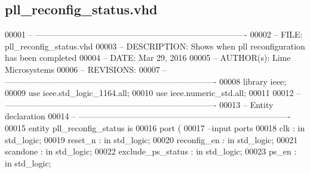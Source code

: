 \subsection{pll\+\_\+reconfig\+\_\+status.\+vhd}
\label{pll__reconfig__status_8vhd_source}

\begin{DoxyCode}
00001 \textcolor{keyword}{-- ---------------------------------------------------------------------------- }
00002 \textcolor{keyword}{-- FILE:    pll\_reconfig\_status.vhd}
00003 \textcolor{keyword}{-- DESCRIPTION: Shows when pll reconfiguration has been completed}
00004 \textcolor{keyword}{-- DATE:    Mar 29, 2016}
00005 \textcolor{keyword}{-- AUTHOR(s):   Lime Microsystems}
00006 \textcolor{keyword}{-- REVISIONS:}
00007 \textcolor{keyword}{-- ---------------------------------------------------------------------------- }
00008 \textcolor{vhdlkeyword}{library }\textcolor{keywordflow}{ieee};
00009 \textcolor{vhdlkeyword}{use }ieee.std\_logic\_1164.\textcolor{keywordflow}{all};
00010 \textcolor{vhdlkeyword}{use }ieee.numeric\_std.\textcolor{keywordflow}{all};
00011 
00012 \textcolor{keyword}{-- ----------------------------------------------------------------------------}
00013 \textcolor{keyword}{-- Entity declaration}
00014 \textcolor{keyword}{-- ----------------------------------------------------------------------------}
00015 \textcolor{keywordflow}{entity }pll_reconfig_status \textcolor{keywordflow}{is}
00016   \textcolor{keywordflow}{port} \textcolor{vhdlchar}{(}
00017 \textcolor{keyword}{        --input ports }
00018         \textcolor{vhdlchar}{clk}                 \textcolor{vhdlchar}{:} \textcolor{keywordflow}{in} \textcolor{comment}{std\_logic};
00019         \textcolor{vhdlchar}{reset_n}             \textcolor{vhdlchar}{:} \textcolor{keywordflow}{in} \textcolor{comment}{std\_logic};
00020           \textcolor{vhdlchar}{reconfig_en}           \textcolor{vhdlchar}{:} \textcolor{keywordflow}{in} \textcolor{comment}{std\_logic};
00021           \textcolor{vhdlchar}{scandone}              \textcolor{vhdlchar}{:} \textcolor{keywordflow}{in} \textcolor{comment}{std\_logic};
00022           \textcolor{vhdlchar}{exclude_ps_status} \textcolor{vhdlchar}{:} \textcolor{keywordflow}{in} \textcolor{comment}{std\_logic};
00023           \textcolor{vhdlchar}{ps_en}                 \textcolor{vhdlchar}{:} \textcolor{keywordflow}{in} \textcolor{comment}{std\_logic};

\end{DoxyCode}
